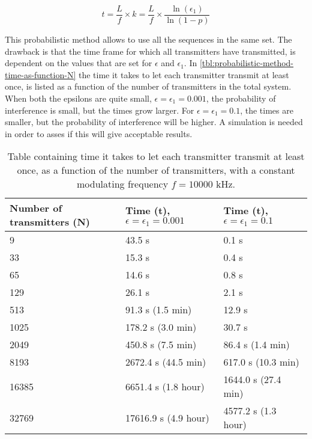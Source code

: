 \begin{equation}
	\label{eq:time-for-probabilistic-txs}
	t = \frac{L}{f} \times k = \frac{L}{f} \times \frac{\ln(\epsilon_1)}{\ln(1 - p)}
\end{equation}

This probabilistic method allows to use all the sequences in the same set.
The drawback is that the time frame for which all transmitters have transmitted, is dependent on the values that are set for $\epsilon$ and $\epsilon_1$.
In \autoref{tbl:probabilistic-method-time-as-function-N} the time it takes to let each transmitter transmit at least once, is listed as a function of the number of transmitters in the total system. 
When both the epsilons are quite small, $\epsilon = \epsilon_1 = 0.001$, the probability of interference is small, but the times grow larger.
For $\epsilon = \epsilon_1 = 0.1$, the times are smaller, but the probability of interference will be higher.
A simulation is needed in order to asses if this will give acceptable results.



\begin{table}[h]
	\centering
	\begin{tabular}{  | l | l | l | }

		\hline
		Number of transmitters (N)	& Time (t), $\epsilon = \epsilon_1 = 0.001$	& Time (t), $\epsilon = \epsilon_1 = 0.1$		\\ \hline

		9							& 43.5 s									& 0.1 s 										\\ \hline
		33							& 15.3 s									& 0.4 s											\\ \hline
		65							& 14.6 s									& 0.8 s											\\ \hline
		129							& 26.1 s									& 2.1 s											\\ \hline
		513							& 91.3 s (1.5 min)							& 12.9 s										\\ \hline
		1025						& 178.2 s	(3.0 min)						& 30.7 s										\\ \hline
		2049						& 450.8 s	(7.5 min)						& 86.4 s (1.4 min)								\\ \hline
		8193						& 2672.4 s (44.5 min)						& 617.0 s (10.3 min)							\\ \hline
		16385						& 6651.4 s (1.8 hour)						& 1644.0 s (27.4 min)							\\ \hline
		32769						& 17616.9 s (4.9 hour)						& 4577.2 s (1.3 hour)							\\ \hline


	\end{tabular}
	\caption{Table containing time it takes to let each transmitter transmit at least once, as a function of the number of transmitters, with a constant modulating frequency $f = 10000$ kHz.}
	\label{tbl:probabilistic-method-time-as-function-N}
\end{table}

